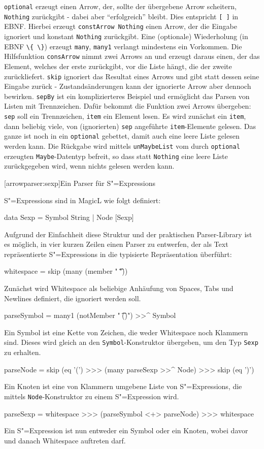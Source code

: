 \documentclass[11pt, a4paper, bibgerm]{book}
\newcommand\icode[1]{\lstinline?#1?}
\newcommand\lsection{}
\newcommand{\sexp}{S"=Expression}
\newcommand{\sexps}{S"=Expressions}
\begin{document}
\icode{optional} erzeugt einen Arrow, der, sollte der übergebene Arrow
scheitern, \icode{Nothing} zurückgibt - dabei aber "`erfolgreich"'
bleibt. Dies entspricht \icode{[ ]} in EBNF. Hierbei erzeugt
\icode{constArrow Nothing} einen Arrow, der die Eingabe ignoriert und
konstant \icode{Nothing} zurückgibt. Eine (optionale) Wiederholung (in EBNF
\icode{\{ \}}) erzeugt \icode{many}, \icode{many1} verlangt mindestens
ein Vorkommen. Die Hilfsfunktion \icode{consArrow} nimmt zwei
Arrows an und erzeugt daraus einen, der das Element, welches der erste
zurückgibt, vor die Liste hängt, die der zweite zurückliefert.
\icode{skip} ignoriert das Resultat eines Arrows und gibt
statt dessen seine Eingabe zurück - Zustandsänderungen kann der
ignorierte Arrow aber dennoch bewirken. \icode{sepBy} ist ein
komplizierteres Beispiel und ermöglicht das Parsen von Listen mit
Trennzeichen. Dafür bekommt die Funktion zwei Arrows übergeben:
\icode{sep} soll ein Trennzeichen, \icode{item} ein Element lesen. Es
wird zunächst ein \icode{item}, dann beliebig viele, von (ignorierten)
\icode{sep} angeführte \icode{item}-Elemente gelesen. Das ganze ist noch
in ein \icode{optional} gebettet, damit auch eine leere Liste gelesen
werden kann. Die Rückgabe wird mittels \icode{unMaybeList} vom durch
\icode{optional} erzeugten \icode{Maybe}-Datentyp befreit, so dass statt
\icode{Nothing} eine leere Liste zurückgegeben wird, wenn nichts gelesen
werden kann.

\lsection[arrowparser:sexp]{Ein Parser für \sexps{}}

\sexps{} sind in MagicL wie folgt definiert:
\begin{code}
data Sexp = Symbol String
          | Node [Sexp]
\end{code}

Aufgrund der Einfachheit diese Struktur und der praktischen
Parser-Library ist es möglich, in vier kurzen Zeilen einen Parser zu
entwerfen, der als Text repräsentierte \sexps{} in die typisierte
Repräsentation überführt:

\begin{code}
whitespace = skip (many (member " \t\n"))
\end{code}
Zunächst wird Whitespace als beliebige Anhäufung von Spaces, Tabs und
Newlines definiert, die ignoriert werden soll.
\begin{code}
parseSymbol = many1 (notMember " \t\n()") >>^ Symbol
\end{code} %
Ein Symbol ist eine Kette von Zeichen, die weder Whitespace noch
Klammern sind. Dieses wird gleich an den \icode{Symbol}-Konstruktor
übergeben, um den Typ \icode{Sexp} zu erhalten.
\begin{code}
parseNode = skip (eq '(') >>> (many parseSexp >>^ Node) >>> skip (eq ')')
\end{code} %
Ein Knoten ist eine von Klammern umgebene Liste von \sexps{}, die
mittels \icode{Node}-Konstruktor zu einem \sexp{} wird.
\begin{code}
parseSexp = whitespace >>> (parseSymbol <+> parseNode) >>> whitespace
\end{code} %
Ein \sexp{} ist nun entweder ein Symbol oder ein Knoten, wobei davor und
danach Whitespace auftreten darf.
\end{document}
